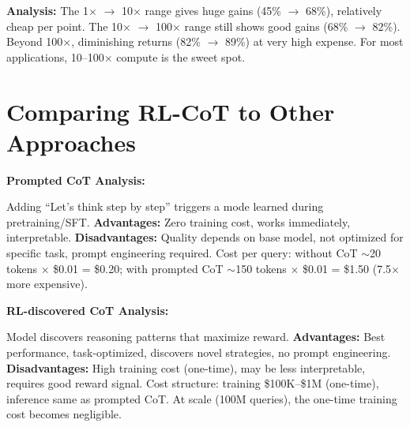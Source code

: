\begin{chapterenv}
\textbf{Analysis:} The 1$\times$ $\to$ 10$\times$ range gives huge gains (45\% $\to$ 68\%), relatively cheap per point. The 10$\times$ $\to$ 100$\times$ range still shows good gains (68\% $\to$ 82\%). Beyond 100$\times$, diminishing returns (82\% $\to$ 89\%) at very high expense. For most applications, 10--100$\times$ compute is the sweet spot.

\section{Comparing RL-CoT to Other Approaches}

\begin{infobox}
\textbf{Prompted CoT Analysis:}

Adding ``Let's think step by step'' triggers a mode learned during pretraining/SFT. \textbf{Advantages:} Zero training cost, works immediately, interpretable. \textbf{Disadvantages:} Quality depends on base model, not optimized for specific task, prompt engineering required. Cost per query: without CoT $\sim$20 tokens $\times$ \$0.01 = \$0.20; with prompted CoT $\sim$150 tokens $\times$ \$0.01 = \$1.50 (7.5$\times$ more expensive).

\textbf{RL-discovered CoT Analysis:}

Model discovers reasoning patterns that maximize reward. \textbf{Advantages:} Best performance, task-optimized, discovers novel strategies, no prompt engineering. \textbf{Disadvantages:} High training cost (one-time), may be less interpretable, requires good reward signal. Cost structure: training \$100K--\$1M (one-time), inference same as prompted CoT. At scale (100M queries), the one-time training cost becomes negligible.
\end{infobox}

\end{chapterenv}